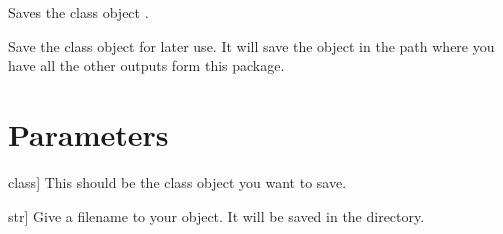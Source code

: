 \documentclass[letterpaper,10pt,english]{sphinxmanual}
\begin{document}
\begin{fulllineitems}
\label{\detokenize{api:furs.save_furs}}
\pysigstartsignatures
{}
\pysigstopsignatures
\sphinxAtStartPar
Saves the class object {\hyperref[\detokenize{api:module-furs}]{}}.

\sphinxAtStartPar
Save the class object {\hyperref[\detokenize{api:module-furs}]{}} for later use. It will save the object in the path where you have all the other outputs
form this package.


\section{Parameters}
\label{\detokenize{api:parameters}}\begin{description}
\sphinxlineitem{obj}{[}class{]}
\sphinxAtStartPar
This should be the class object you want to save.

\sphinxlineitem{filename}{[}str{]}
\sphinxAtStartPar
Give a filename to your object. It will be saved in the  directory.

\end{description}

\end{fulllineitems}

\end{document}
